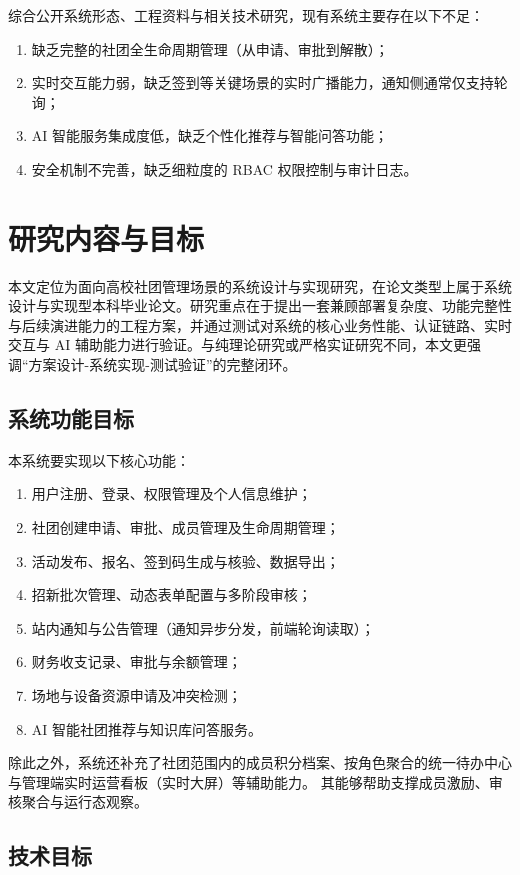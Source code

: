 综合公开系统形态、工程资料与相关技术研究，现有系统主要存在以下不足：
\begin{enumerate}
  \item 缺乏完整的社团全生命周期管理（从申请、审批到解散）；
  \item 实时交互能力弱，缺乏签到等关键场景的实时广播能力，通知侧通常仅支持轮询；
  \item AI 智能服务集成度低，缺乏个性化推荐与智能问答功能；
  \item 安全机制不完善，缺乏细粒度的 RBAC 权限控制与审计日志\cite{rbac_model}。
\end{enumerate}

\section{研究内容与目标}

\noindent 本文定位为面向高校社团管理场景的系统设计与实现研究，在论文类型上属于系统设计与实现型本科毕业论文。研究重点在于提出一套兼顾部署复杂度、功能完整性与后续演进能力的工程方案，并通过测试对系统的核心业务性能、认证链路、实时交互与 AI 辅助能力进行验证。与纯理论研究或严格实证研究不同，本文更强调“方案设计-系统实现-测试验证”的完整闭环。

\subsection{系统功能目标}

本系统要实现以下核心功能：
\begin{enumerate}
  \item 用户注册、登录、权限管理及个人信息维护；
  \item 社团创建申请、审批、成员管理及生命周期管理；
  \item 活动发布、报名、签到码生成与核验、数据导出；
  \item 招新批次管理、动态表单配置与多阶段审核；
  \item 站内通知与公告管理（通知异步分发，前端轮询读取）；
  \item 财务收支记录、审批与余额管理；
  \item 场地与设备资源申请及冲突检测；
  \item AI 智能社团推荐与知识库问答服务。
\end{enumerate}

除此之外，系统还补充了社团范围内的成员积分档案、按角色聚合的统一待办中心与管理端实时运营看板（实时大屏）等辅助能力。
其能够帮助支撑成员激励、审核聚合与运行态观察。

\subsection{技术目标}

